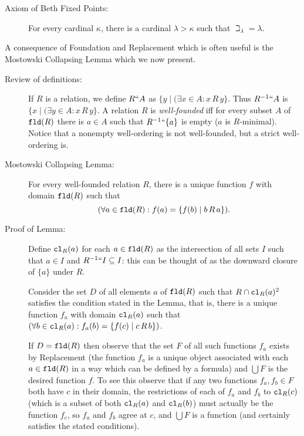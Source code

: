 \documentclass[12pt]{book}
\begin{document}
\begin{description}

\item[Axiom of Beth Fixed Points:]  For every cardinal $\kappa$, there is a cardinal $\lambda>\kappa$ such that $\beth_{\lambda} = \lambda$.

\end{description}

A consequence of Foundation and Replacement which is often useful is the Mostowski Collapsing Lemma which we now present.

\begin{description}

\item[Review of definitions:]  If $R$ is a relation, we define $R``A$ as $\{y\mid (\exists x \in A:x\,R\,y\}$.   Thus $R^{-1}``A$ is
$\{x\mid (\exists y \in A:x\,R\,y\}$.  A relation $R$ is {\em well-founded\/} iff for every subset $A$ of ${\tt fld}(R)$ there is $a \in A$ such that
$R^{-1}``\{a\}$ is empty ($a$ is $R$-minimal).  Notice that a nonempty well-ordering is not well-founded, but a strict well-ordering is.

\item[Mostowski Collapsing Lemma:]  For every well-founded relation $R$, there is a unique function $f$ with domain ${\tt fld}(R)$ such that
$$(\forall a \in {\tt fld}(R) : f(a) = \{f(b) \mid b \,R\,a\}).$$

\item[Proof of Lemma:]  Define ${\tt cl}_R(a)$ for each $a \in {\tt fld}(R)$ as the intersection of all sets $I$ such that $a \in I$ and $R^{-1}``I \subseteq I$:  this can be thought of as the downward closure of $\{a\}$ under $R$.

Consider the set $D$ of all elements $a$ of ${\tt fld}(R)$ such that $R \cap {\tt cl}_R(a)^2$ satisfies the condition stated in the Lemma,
that is, there is a unique function $f_a$ with domain ${\tt cl}_R(a)$ such that $(\forall b \in {\tt cl}_R(a) : f_a(b) = \{f(c) \mid c\,R\,b\})$.

If $D = {\tt fld}(R)$ then observe that the set $F$ of all such functions $f_a$ exists by Replacement (the function $f_a$ is a unique object associated with each $a \in {\tt fld}(R)$ in a way which can be defined by a formula) and $\bigcup F$ is the desired function $f$.  To see this observe that
if any two functions $f_a, f_b \in F$ both have $c$ in their domain, the restrictions of each of $f_a$ and $f_b$ to ${\tt cl}_R(c)$ (which is a subset of
both ${\tt cl}_R(a)$ and ${\tt cl}_R(b)$) must actually be the function $f_c$, so $f_a$ and $f_b$ agree at $c$, and $\bigcup F$ is a function
(and certainly satisfies the stated conditions).


\end{description}
\end{document}
